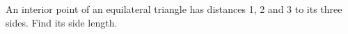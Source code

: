 An interior point of an equilateral triangle has distances 1, 2 and 3 to its three sides. Find its side length.
